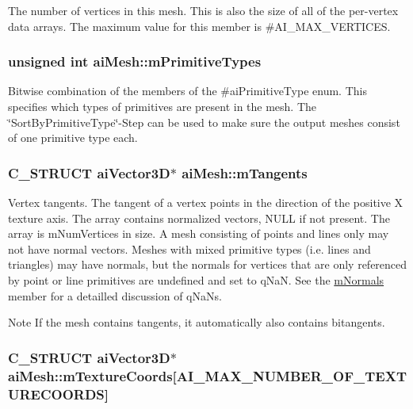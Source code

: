 The number of vertices in this mesh. This is also the size of all of the per-\/vertex data arrays. The maximum value for this member is \#\-A\-I\-\_\-\-M\-A\-X\-\_\-\-V\-E\-R\-T\-I\-C\-E\-S. \hypertarget{structai_mesh_a99d66ac0a444068c1b252b30265cbf53}{
\subsubsection[{m\-Primitive\-Types}]{\setlength{\rightskip}{0pt plus 5cm}unsigned int ai\-Mesh\-::m\-Primitive\-Types}}\label{structai_mesh_a99d66ac0a444068c1b252b30265cbf53}
Bitwise combination of the members of the \#ai\-Primitive\-Type enum. This specifies which types of primitives are present in the mesh. The \char`\"{}\-Sort\-By\-Primitive\-Type\char`\"{}-\/\-Step can be used to make sure the output meshes consist of one primitive type each. \hypertarget{structai_mesh_af367ff78bd69f3e83d7edc8ad67dc5df}{
\subsubsection[{m\-Tangents}]{\setlength{\rightskip}{0pt plus 5cm}C\-\_\-\-S\-T\-R\-U\-C\-T {\bf ai\-Vector3\-D}$\ast$ ai\-Mesh\-::m\-Tangents}}\label{structai_mesh_af367ff78bd69f3e83d7edc8ad67dc5df}
Vertex tangents. The tangent of a vertex points in the direction of the positive X texture axis. The array contains normalized vectors, N\-U\-L\-L if not present. The array is m\-Num\-Vertices in size. A mesh consisting of points and lines only may not have normal vectors. Meshes with mixed primitive types (i.\-e. lines and triangles) may have normals, but the normals for vertices that are only referenced by point or line primitives are undefined and set to q\-Na\-N. See the \hyperlink{structai_mesh_aec81b496b4d93838cef038933dabe9b9}{m\-Normals} member for a detailled discussion of q\-Na\-Ns. \begin{DoxyNote}{Note}
If the mesh contains tangents, it automatically also contains bitangents. 
\end{DoxyNote}
\hypertarget{structai_mesh_a4a50b11d00ef50f419c75cab0f6bddd6}{
\subsubsection[{m\-Texture\-Coords}]{\setlength{\rightskip}{0pt plus 5cm}C\-\_\-\-S\-T\-R\-U\-C\-T {\bf ai\-Vector3\-D}$\ast$ ai\-Mesh\-::m\-Texture\-Coords\mbox{[}A\-I\-\_\-\-M\-A\-X\-\_\-\-N\-U\-M\-B\-E\-R\-\_\-\-O\-F\-\_\-\-T\-E\-X\-T\-U\-R\-E\-C\-O\-O\-R\-D\-S\mbox{]}}}\label{structai_mesh_a4a50b11d00ef50f419c75cab0f6bddd6}
